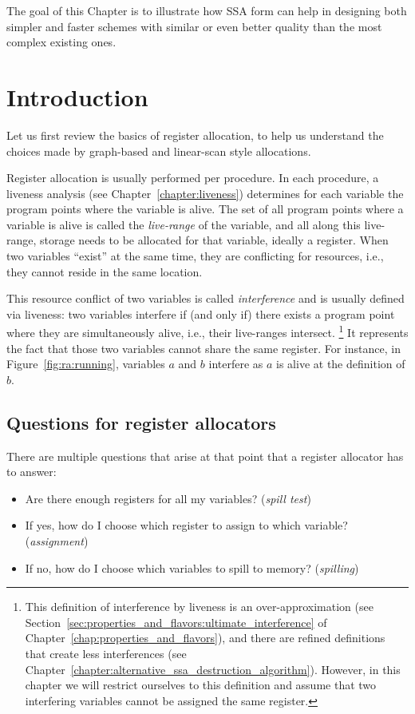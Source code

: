 {The goal of this Chapter is to illustrate how SSA form can help in designing both simpler and faster schemes with similar or even better quality than the most complex existing ones.

\section{Introduction}

Let us first review the basics of register allocation, to help us understand the choices made by graph-based and linear-scan style allocations.

Register allocation is usually performed per procedure. 
In each procedure, a liveness analysis (see Chapter~\ref{chapter:liveness}) determines for each variable the program points where the variable is alive. 
The set of all program points where a variable is alive is called the \emph{live-range} of the variable, and all along this live-range, storage needs to be allocated for that variable, ideally a register. When two variables ``exist'' at the same time, they are conflicting for resources, i.e., they cannot reside in the same location.

This resource conflict of two variables is called \emph{interference} and is usually defined via liveness: 
two variables interfere if (and only if) there exists a program point where they are simultaneously alive, i.e., their live-ranges intersect.%
\footnote{ This definition of interference by liveness is an over-approximation (see Section~\ref{sec:properties_and_flavors:ultimate_interference} of Chapter~\ref{chap:properties_and_flavors}), and there are refined definitions that create less interferences (see Chapter~\ref{chapter:alternative_ssa_destruction_algorithm}). 
  However, in this chapter we will restrict ourselves to this definition and assume that two interfering variables cannot be assigned the same register. 
}
It represents the fact that those two variables cannot share the same register.
For instance, in Figure~\ref{fig:ra:running}, variables $a$ and $b$ interfere 
as $a$ is alive at the definition of $b$.

\subsection{Questions for register allocators}

There are multiple questions that arise at that point that a register allocator has to answer:
\begin{itemize}
  \item Are there enough registers for all my variables? (\emph{spill test})
  \item If yes, how do I choose which register to assign to which variable? (\emph{assignment})
  \item If no, how do I choose which variables to spill to memory? (\emph{spilling})
\end{itemize}

}
